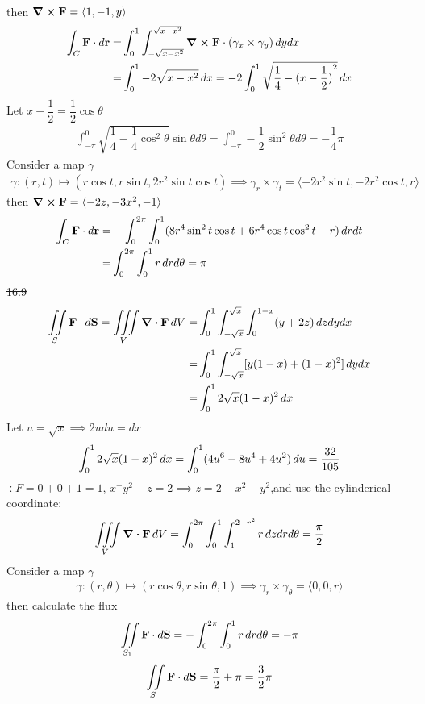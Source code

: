 \documentclass[12pt, a4paper]{article}
\begin{document}
\begin{CJK*}{UTF8}{bsmi}
\begin{align}
\end{align}
then $\curl{\textbf F} = \langle 1,-1,y\rangle$
\begin{align}
    \int_C \textbf F \cdot d\textbf r=& \int_0^1\int_{-\sqrt{x-x^2}}^{\sqrt{x-x^2}} \curl{\textbf F}\cdot(\gamma_x\times \gamma_y)\,dy dx\\
    =&\int_0^1 -2\sqrt{x-x^2}\,dx = -2 \int_0^1\sqrt{\dfrac{1}{4}- {(x-\dfrac{1}{2}) }^2}\,dx 
\end{align}
Let $x-\dfrac{1}{2}=\dfrac{1}{2}\cos\theta$
\begin{align}
    \int_{-\pi}^0 \sqrt{\dfrac{1}{4}-\dfrac{1}{4}\cos^2\theta} \sin\theta d\theta = \int_{-\pi}^0 -\dfrac{1}{2}\sin^2\theta d\theta=-\dfrac{1}{4}\pi
\end{align}
Consider a map $\gamma$
\begin{align}
    \gamma: (r,t) \longmapsto (r\cos t,r\sin t,2r^2 \sin t\cos t) \implies \gamma_r \times \gamma_t = \langle -2r^2\sin t,-2r^2\cos t, r\rangle
\end{align}
then $\curl{\textbf F} = \langle -2z,-3x^2,-1\rangle$
\begin{align}
    \int_C \textbf F \cdot d \textbf r =& - \int_0^{2\pi}\int_0^1(8r^4\sin^2 t\cos t+6r^4 \cos t\cos^2 t -r)\,dr dt\\
    =&\int_0^{2\pi}\int_0^1 r\,dr d\theta = \pi
\end{align}
\st{16.9}
\begin{align} 
    \iint\limits_S \textbf F \cdot d \textbf S = \iiint\limits_V \div{\textbf F}\,dV=&\int_0^1 \int_{-\sqrt{x}}^{\sqrt{x}}\int_0^{1-x}(y+2z)\,dz dy dx\\
    =&\int_0^1 \int_{-\sqrt{x}}^{\sqrt{x}}[y(1-x)+(1-x)^2]\,dy dx\\
    =&\int_0^1 2\sqrt{x}(1-x)^2\,dx
\end{align}
Let $u=\sqrt{x}\implies 2u du =dx$
\begin{align}
    \int_0^1 2\sqrt{x}(1-x)^2\,dx = \int_0^1 (4u^6-8u^4+4u^2)\,du=\dfrac{32}{105}
\end{align}
$\div F = 0+0+1=1,\, x^+y^2+z=2 \implies z=2-x^2-y^2$,and use the cylinderical coordinate:
\begin{align}
    \iiint\limits_V \div{\textbf F}\, dV= \int_0^{2\pi}\int_0^1\int_1^{2-r^2}r \,dz drd\theta=\dfrac{\pi}{2}
\end{align}
Consider a map $\gamma$
\begin{align}
    \gamma : (r,\theta) \longmapsto (r\cos\theta, r\sin\theta,1)\implies \gamma_r \times \gamma_\theta = \langle 0,0,r\rangle
\end{align}
then calculate the flux
\begin{align}
    \iint\limits_{S_1} \textbf F \cdot d\textbf S= - \int_0^{2\pi}\int_0^1 r\,dr d\theta=-\pi
\end{align}
\begin{align}
    \iint\limits_S \textbf F \cdot d \textbf S=\dfrac{\pi}{2}+\pi=\dfrac{3}{2}\pi
\end{align}
\end{CJK*}
\end{document}
